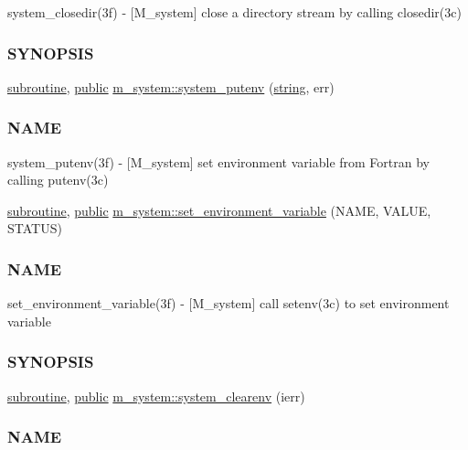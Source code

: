 \begin{DoxyCompactItemize}
\begin{DoxyCompactList}
system\+\_\+closedir(3f) -\/ \mbox{[}M\+\_\+system\mbox{]} close a directory stream by calling closedir(3c) \subsubsection*{S\+Y\+N\+O\+P\+S\+IS}\end{DoxyCompactList}\item 
\hyperlink{M__stopwatch_83_8txt_acfbcff50169d691ff02d4a123ed70482}{subroutine}, \hyperlink{M__stopwatch_83_8txt_a2f74811300c361e53b430611a7d1769f}{public} \hyperlink{namespacem__system_af0c9df8e59cac9cd617cd1e20448ea7d}{m\+\_\+system\+::system\+\_\+putenv} (\hyperlink{what__overview_81_8txt_a74cb7e955273b9f9157b4f0c18a38849}{string}, err)
\begin{DoxyCompactList}\small\item\em \subsubsection*{N\+A\+ME}

system\+\_\+putenv(3f) -\/ \mbox{[}M\+\_\+system\mbox{]} set environment variable from Fortran by calling putenv(3c) \end{DoxyCompactList}\item 
\hyperlink{M__stopwatch_83_8txt_acfbcff50169d691ff02d4a123ed70482}{subroutine}, \hyperlink{M__stopwatch_83_8txt_a2f74811300c361e53b430611a7d1769f}{public} \hyperlink{namespacem__system_ad813765403a5d9d6fb7a2edcb669fe4b}{m\+\_\+system\+::set\+\_\+environment\+\_\+variable} (N\+A\+ME, V\+A\+L\+UE, S\+T\+A\+T\+US)
\begin{DoxyCompactList}\small\item\em \subsubsection*{N\+A\+ME}

set\+\_\+environment\+\_\+variable(3f) -\/ \mbox{[}M\+\_\+system\mbox{]} call setenv(3c) to set environment variable \subsubsection*{S\+Y\+N\+O\+P\+S\+IS}\end{DoxyCompactList}\item 
\hyperlink{M__stopwatch_83_8txt_acfbcff50169d691ff02d4a123ed70482}{subroutine}, \hyperlink{M__stopwatch_83_8txt_a2f74811300c361e53b430611a7d1769f}{public} \hyperlink{namespacem__system_a9c34787b170ab8d41000d7c3acb60736}{m\+\_\+system\+::system\+\_\+clearenv} (ierr)
\begin{DoxyCompactList}\small\item\em \subsubsection*{N\+A\+ME}


\end{DoxyCompactList}
\end{DoxyCompactItemize}
